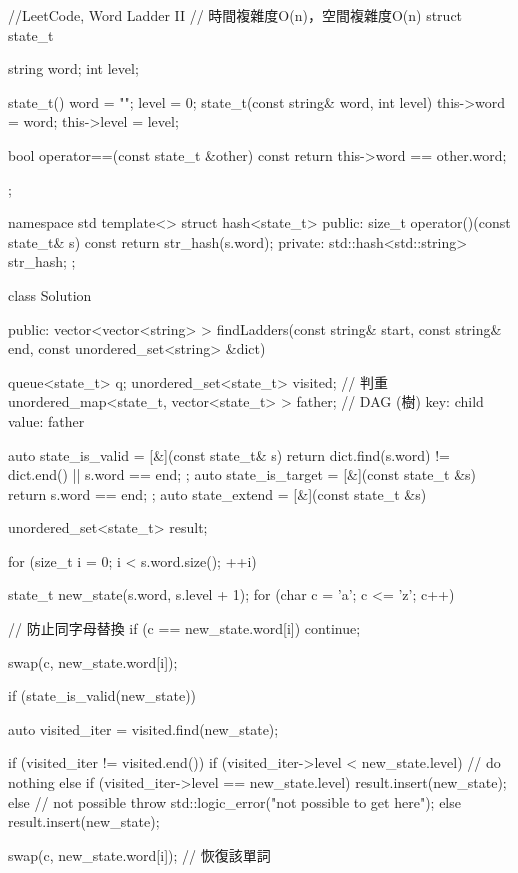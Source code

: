 \begin{Code}
//LeetCode, Word Ladder II
// 時間複雜度O(n)，空間複雜度O(n)
struct state_t {
    string word;
    int level;

    state_t() { word = ""; level = 0; }
    state_t(const string& word, int level) {
        this->word = word;
        this->level = level;
    }

    bool operator==(const state_t &other) const {
        return this->word == other.word;
    }
};

namespace std {
    template<> struct hash<state_t> {
    public:
        size_t operator()(const state_t& s) const {
            return str_hash(s.word);
        }
    private:
        std::hash<std::string> str_hash;
    };
}


class Solution {
public:
    vector<vector<string> > findLadders(const string& start,
        const string& end, const unordered_set<string> &dict) {
        queue<state_t> q;
        unordered_set<state_t> visited; // 判重
        unordered_map<state_t, vector<state_t> > father; // DAG (樹) key: child value: father

        auto state_is_valid = [&](const state_t& s) {
            return dict.find(s.word) != dict.end() || s.word == end;
        };
        auto state_is_target = [&](const state_t &s) {return s.word == end; };
        auto state_extend = [&](const state_t &s) {
            unordered_set<state_t> result;

            for (size_t i = 0; i < s.word.size(); ++i) {
                state_t new_state(s.word, s.level + 1);
                for (char c = 'a'; c <= 'z'; c++) {
                    // 防止同字母替換
                    if (c == new_state.word[i]) continue;

                    swap(c, new_state.word[i]);

                    if (state_is_valid(new_state)) {
                        auto visited_iter = visited.find(new_state);

                        if (visited_iter != visited.end()) {
                            if (visited_iter->level < new_state.level) {
                                // do nothing
                            } else if (visited_iter->level == new_state.level) {
                                result.insert(new_state);
                            } else { // not possible
                                throw std::logic_error("not possible to get here");
                            }
                        } else {
                            result.insert(new_state);
                        }
                    }
                    swap(c, new_state.word[i]); // 恢復該單詞
                }
            }

}}}
\end{Code}
